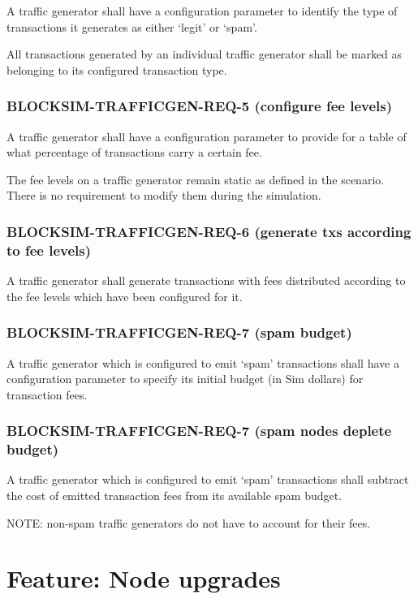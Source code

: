 \documentclass{scrreprt}
\begin{document}
A traffic generator shall have a configuration parameter to
identify the type of transactions it generates as either `legit' or `spam'.

All transactions generated by an individual traffic generator shall
be marked as belonging to its configured transaction type.


\subsubsection{BLOCKSIM-TRAFFICGEN-REQ-5 (configure fee levels)}

A traffic generator shall have a configuration parameter to
provide for a table of what percentage of transactions carry a certain fee.

The fee levels on a traffic generator remain static as defined in the scenario.
There is no requirement to modify them during the simulation.


\subsubsection{BLOCKSIM-TRAFFICGEN-REQ-6 (generate txs according to fee levels)}

A traffic generator shall generate transactions with fees distributed
according to the fee levels which have been configured for it.


\subsubsection{BLOCKSIM-TRAFFICGEN-REQ-7 (spam budget)}

A traffic generator which is configured to emit `spam' transactions
shall have a configuration parameter to specify its initial budget
(in Sim dollars) for transaction fees.


\subsubsection{BLOCKSIM-TRAFFICGEN-REQ-7 (spam nodes deplete budget)}

A traffic generator which is configured to emit `spam' transactions
shall subtract the cost of emitted transaction fees from its available
spam budget.

NOTE: non-spam traffic generators do not have to account for their fees.




\section{Feature: Node upgrades}
\end{document}

